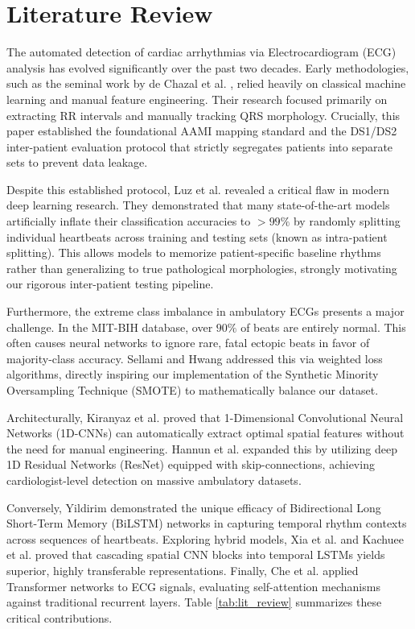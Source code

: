 \documentclass[11pt, conference]{IEEEtran}
\begin{document}
\section{Literature Review}
The automated detection of cardiac arrhythmias via Electrocardiogram (ECG) analysis has evolved significantly over the past two decades. Early methodologies, such as the seminal work by de Chazal et al. \cite{dechazal}, relied heavily on classical machine learning and manual feature engineering. Their research focused primarily on extracting RR intervals and manually tracking QRS morphology. Crucially, this paper established the foundational AAMI mapping standard and the DS1/DS2 inter-patient evaluation protocol that strictly segregates patients into separate sets to prevent data leakage. 

Despite this established protocol, Luz et al. \cite{luz} revealed a critical flaw in modern deep learning research. They demonstrated that many state-of-the-art models artificially inflate their classification accuracies to $>99\%$ by randomly splitting individual heartbeats across training and testing sets (known as intra-patient splitting). This allows models to memorize patient-specific baseline rhythms rather than generalizing to true pathological morphologies, strongly motivating our rigorous inter-patient testing pipeline. 

Furthermore, the extreme class imbalance in ambulatory ECGs presents a major challenge. In the MIT-BIH database, over $90\%$ of beats are entirely normal. This often causes neural networks to ignore rare, fatal ectopic beats in favor of majority-class accuracy. Sellami and Hwang \cite{sellami} addressed this via weighted loss algorithms, directly inspiring our implementation of the Synthetic Minority Oversampling Technique (SMOTE) to mathematically balance our dataset.

Architecturally, Kiranyaz et al. \cite{kiranyaz} proved that 1-Dimensional Convolutional Neural Networks (1D-CNNs) can automatically extract optimal spatial features without the need for manual engineering. Hannun et al. \cite{hannun} expanded this by utilizing deep 1D Residual Networks (ResNet) equipped with skip-connections, achieving cardiologist-level detection on massive ambulatory datasets. 

Conversely, Yildirim \cite{yildirim} demonstrated the unique efficacy of Bidirectional Long Short-Term Memory (BiLSTM) networks in capturing temporal rhythm contexts across sequences of heartbeats. Exploring hybrid models, Xia et al. \cite{xia} and Kachuee et al. \cite{kachuee} proved that cascading spatial CNN blocks into temporal LSTMs yields superior, highly transferable representations. Finally, Che et al. \cite{che} applied Transformer networks to ECG signals, evaluating self-attention mechanisms against traditional recurrent layers. Table \ref{tab:lit_review} summarizes these critical contributions.
\end{document}
